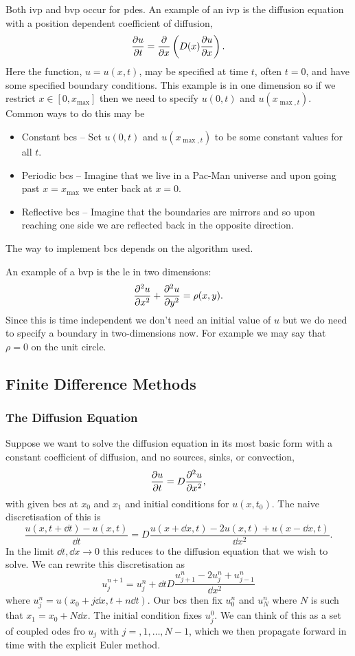 \documentclass[a4paper]{article}
\begin{document}
    Both \gls{ivp} and \gls{bvp} occur for \glspl{pde}.
    An example of an \gls{ivp} is the diffusion equation with a position dependent coefficient of diffusion,
    \[\pdv{u}{t} = \pdv{x}\left(D(x)\pdv{u}{x}\right).\]
    Here the function, \(u = u(x, t)\), may be specified at time \(t\), often \(t = 0\), and have some specified boundary conditions.
    This example is in one dimension so if we restrict \(x\in[0, x_{\max}]\) then we need to specify \(u(0, t)\) and \(u(x_{\max, t})\).
    Common ways to do this may be
    \begin{itemize}
        \item Constant \glspl{bc} -- Set \(u(0, t)\) and \(u(x_{\max, t})\) to be some constant values for all \(t\).
        \item Periodic \glspl{bc} -- Imagine that we live in a Pac-Man universe and upon going past \(x = x_{\max}\) we enter back at \(x = 0\).
        \item Reflective \glspl{bc} -- Imagine that the boundaries are mirrors and so upon reaching one side we are reflected back in the opposite direction.
    \end{itemize}
    The way to implement \glspl{bc} depends on the algorithm used.
    
    An example of a \gls{bvp} is the \gls{le} in two dimensions:
    \[\pdv[2]{u}{x} + \pdv[2]{u}{y} = \rho(x, y).\]
    Since this is time independent we don't need an initial value of \(u\) but we do need to specify a boundary in two-dimensions now.
    For example we may say that \(\rho = 0\) on the unit circle.
    
    \subsection{Finite Difference Methods}
    \subsubsection{The Diffusion Equation}
    Suppose we want to solve the diffusion equation in its most basic form with a constant coefficient of diffusion, and no sources, sinks, or convection,
    \[\pdv{u}{t} = D\pdv[2]{u}{x},\]
    with given \glspl{bc} at \(x_0\) and \(x_1\) and initial conditions for \(u(x, t_0)\).
    The naive discretisation of this is
    \[\frac{u(x, t + \dd{t}) - u(x, t)}{\dd{t}} = D\frac{u(x + \dd{x}, t) - 2u(x, t) + u(x - \dd{x}, t)}{\dd{x}^2}.\]
    In the limit \(\dd{t}, \dd{x}\to 0\) this reduces to the diffusion equation that we wish to solve.
    We can rewrite this discretisation as
    \[u_j^{n+1} = u_j^n + \dd{t}D\frac{u_{j+1}^n - 2u_j^n + u_{j-1}^n}{\dd{x}^2}\]
    where \(u_j^n = u(x_0 + j\dd{x}, t + n\dd{t})\).
    Our \glspl{bc} then fix \(u_0^n\) and \(u_N^n\) where \(N\) is such that \(x_1 = x_0 + N\dd{x}\).
    The initial condition fixes \(u_j^0\).
    We can think of this as a set of coupled \glspl{ode} fro \(u_j\) with \(j = , 1, \dotsc, N-1\), which we then propagate forward in time with the explicit Euler method.
    
\end{document}
